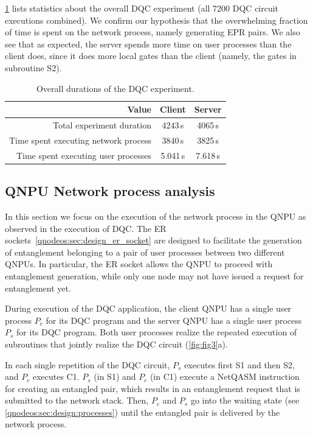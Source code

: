 \cref{tab:exp_durations} lists statistics about the overall \ac{DQC} experiment (all 7200 \ac{DQC} circuit executions combined). We confirm our hypothesis that the overwhelming fraction of time is spent on the network process, namely generating \ac{EPR} pairs. We also see that as expected, the server spends more time on user processes than the client does, since it does more local gates than the client (namely, the gates in subroutine S2).

\begin{table}[htpb]
    \centering
    \begin{tabular}{|r|c|c|}
    \hline
    \textbf{Value} & \textbf{Client} & \textbf{Server} \\ 
    \hline
    Total experiment duration & 4243\,s & 4065\,s \\
    Time spent executing network process & 3840\,s & 3825\,s \\
    Time spent executing user processes & 5.041\,s & 7.618\,s \\
    \hline
    \end{tabular}
    \caption{Overall durations of the \ac{DQC} experiment.}
    \label{tab:exp_durations}
\end{table}

\subsection{QNPU Network process analysis}

In this section we focus on the execution of the network process in the \ac{QNPU} as observed in the execution of \ac{DQC}. The \ac{ER} sockets~\ref{qnodeos:sec:design_er_socket} are designed to facilitate the generation of entanglement belonging to a pair of user processes between two different \acp{QNPU}. In particular, the \ac{ER} socket allows the \ac{QNPU} to proceed with entanglement generation, while only one node may not have issued a request for entanglement yet. 

During execution of the \ac{DQC} application, the client \ac{QNPU} has a single user process $P_c$ for its \ac{DQC} program and the server \ac{QNPU} has a single user process $P_s$ for its \ac{DQC} program. Both user processes realize the repeated execution of subroutines that jointly realize the \ac{DQC} circuit (\cref{fig:fig3}a).

In each single repetition of the \ac{DQC} circuit, $P_s$ executes first S1 and then S2, and $P_c$ executes C1. $P_s$ (in S1) and $P_c$ (in C1) execute a \ac{NetQASM} instruction for creating an entangled pair, which results in an entanglement request that is submitted to the network stack. Then, $P_c$ and $P_s$ go into the waiting state (see \cref{qnodeos:sec:design:processes}) until the entangled pair is delivered by the network process.

